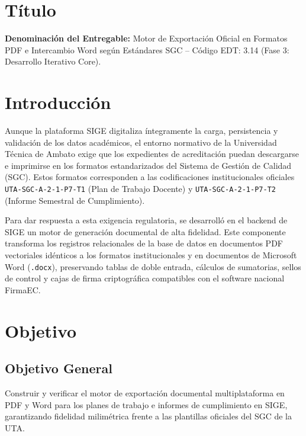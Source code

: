 \documentclass[12pt,a4paper]{article}
\begin{document}

\vspace{0.25cm}

\section{Título}
\textbf{Denominación del Entregable:} Motor de Exportación Oficial en Formatos PDF e Intercambio Word según Estándares SGC -- Código EDT: 3.14 (Fase 3: Desarrollo Iterativo Core).

\section{Introducción}
Aunque la plataforma SIGE digitaliza íntegramente la carga, persistencia y validación de los datos académicos, el entorno normativo de la Universidad Técnica de Ambato exige que los expedientes de acreditación puedan descargarse e imprimirse en los formatos estandarizados del Sistema de Gestión de Calidad (SGC). Estos formatos corresponden a las codificaciones institucionales oficiales \texttt{UTA-SGC-A-2-1-P7-T1} (Plan de Trabajo Docente) y \texttt{UTA-SGC-A-2-1-P7-T2} (Informe Semestral de Cumplimiento).

Para dar respuesta a esta exigencia regulatoria, se desarrolló en el backend de SIGE un motor de generación documental de alta fidelidad. Este componente transforma los registros relacionales de la base de datos en documentos PDF vectoriales idénticos a los formatos institucionales y en documentos de Microsoft Word (\texttt{.docx}), preservando tablas de doble entrada, cálculos de sumatorias, sellos de control y cajas de firma criptográfica compatibles con el software nacional FirmaEC.

\section{Objetivo}

\subsection{Objetivo General}
Construir y verificar el motor de exportación documental multiplataforma en PDF y Word para los planes de trabajo e informes de cumplimiento en SIGE, garantizando fidelidad milimétrica frente a las plantillas oficiales del SGC de la UTA.
\end{document}
